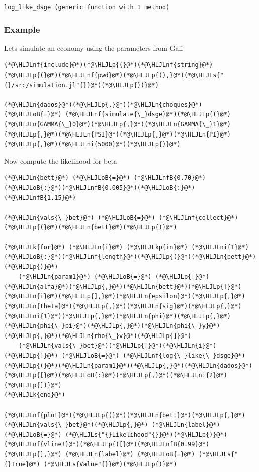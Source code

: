 \documentclass[12pt,a4paper]{article}
\newcommand{\HLJLk}[1]{\textcolor[RGB]{148,91,176}{\textbf{#1}}}
\newcommand{\HLJLkp}[1]{\textcolor[RGB]{148,91,176}{\textbf{#1}}}
\newcommand{\HLJLn}[1]{#1}
\newcommand{\HLJLnf}[1]{\textcolor[RGB]{66,102,213}{#1}}
\newcommand{\HLJLs}[1]{\textcolor[RGB]{201,61,57}{#1}}
\newcommand{\HLJLnfB}[1]{\textcolor[RGB]{59,151,46}{#1}}
\newcommand{\HLJLni}[1]{\textcolor[RGB]{59,151,46}{#1}}
\newcommand{\HLJLoB}[1]{\textcolor[RGB]{102,102,102}{\textbf{#1}}}
\newcommand{\HLJLp}[1]{#1}
\begin{document}
\begin{lstlisting}
log_like_dsge (generic function with 1 method)
\end{lstlisting}


\subsubsection{Example}
Lets simulate an economy using the parameters from Gali


\begin{lstlisting}
(*@\HLJLnf{include}@*)(*@\HLJLp{(}@*)(*@\HLJLnf{string}@*)(*@\HLJLp{(}@*)(*@\HLJLnf{pwd}@*)(*@\HLJLp{(),}@*)(*@\HLJLs{"{}/src/simulation.jl"{}}@*)(*@\HLJLp{))}@*)

(*@\HLJLn{dados}@*)(*@\HLJLp{,}@*)(*@\HLJLn{choques}@*) (*@\HLJLoB{=}@*) (*@\HLJLnf{simulate{\_}dsge}@*)(*@\HLJLp{(}@*)(*@\HLJLn{GAMMA{\_}0}@*)(*@\HLJLp{,}@*)(*@\HLJLn{GAMMA{\_}1}@*)(*@\HLJLp{,}@*)(*@\HLJLn{PSI}@*)(*@\HLJLp{,}@*)(*@\HLJLn{PI}@*)(*@\HLJLp{,}@*)(*@\HLJLni{5000}@*)(*@\HLJLp{)}@*)
\end{lstlisting}


Now compute the likelihood for beta


\begin{lstlisting}
(*@\HLJLn{bett}@*) (*@\HLJLoB{=}@*) (*@\HLJLnfB{0.70}@*)(*@\HLJLoB{:}@*)(*@\HLJLnfB{0.005}@*)(*@\HLJLoB{:}@*)(*@\HLJLnfB{1.15}@*)

(*@\HLJLn{vals{\_}bet}@*) (*@\HLJLoB{=}@*) (*@\HLJLnf{collect}@*)(*@\HLJLp{(}@*)(*@\HLJLn{bett}@*)(*@\HLJLp{)}@*)

(*@\HLJLk{for}@*) (*@\HLJLn{i}@*) (*@\HLJLkp{in}@*) (*@\HLJLni{1}@*)(*@\HLJLoB{:}@*)(*@\HLJLnf{length}@*)(*@\HLJLp{(}@*)(*@\HLJLn{bett}@*)(*@\HLJLp{)}@*)
    (*@\HLJLn{param1}@*) (*@\HLJLoB{=}@*) (*@\HLJLp{[}@*)(*@\HLJLn{alfa}@*)(*@\HLJLp{,}@*)(*@\HLJLn{bett}@*)(*@\HLJLp{[}@*)(*@\HLJLn{i}@*)(*@\HLJLp{],}@*)(*@\HLJLn{epsilon}@*)(*@\HLJLp{,}@*)(*@\HLJLn{theta}@*)(*@\HLJLp{,}@*)(*@\HLJLn{sig}@*)(*@\HLJLp{,}@*)(*@\HLJLni{1}@*)(*@\HLJLp{,}@*)(*@\HLJLn{phi}@*)(*@\HLJLp{,}@*)(*@\HLJLn{phi{\_}pi}@*)(*@\HLJLp{,}@*)(*@\HLJLn{phi{\_}y}@*)(*@\HLJLp{,}@*)(*@\HLJLn{rho{\_}v}@*)(*@\HLJLp{]}@*)
    (*@\HLJLn{vals{\_}bet}@*)(*@\HLJLp{[}@*)(*@\HLJLn{i}@*)(*@\HLJLp{]}@*) (*@\HLJLoB{=}@*) (*@\HLJLnf{log{\_}like{\_}dsge}@*)(*@\HLJLp{(}@*)(*@\HLJLn{param1}@*)(*@\HLJLp{,}@*)(*@\HLJLn{dados}@*)(*@\HLJLp{[}@*)(*@\HLJLoB{:}@*)(*@\HLJLp{,}@*)(*@\HLJLni{2}@*)(*@\HLJLp{])}@*)
(*@\HLJLk{end}@*)

(*@\HLJLnf{plot}@*)(*@\HLJLp{(}@*)(*@\HLJLn{bett}@*)(*@\HLJLp{,}@*)(*@\HLJLn{vals{\_}bet}@*)(*@\HLJLp{,}@*) (*@\HLJLn{label}@*) (*@\HLJLoB{=}@*) (*@\HLJLs{"{}Likelihood"{}}@*)(*@\HLJLp{)}@*)
(*@\HLJLnf{vline!}@*)(*@\HLJLp{([}@*)(*@\HLJLnfB{0.99}@*)(*@\HLJLp{],}@*) (*@\HLJLn{label}@*) (*@\HLJLoB{=}@*) (*@\HLJLs{"{}True}@*) (*@\HLJLs{Value"{}}@*)(*@\HLJLp{)}@*)
\end{lstlisting}
\end{document}
